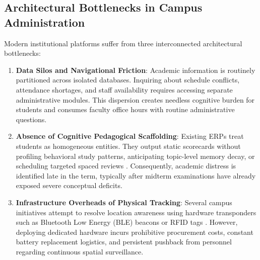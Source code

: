 \documentclass[conference]{IEEEtran}
\begin{document}
\subsection{Architectural Bottlenecks in Campus Administration}
Modern institutional platforms suffer from three interconnected architectural bottlenecks:
\begin{enumerate}
    \item \textbf{Data Silos and Navigational Friction}: Academic information is routinely partitioned across isolated databases. Inquiring about schedule conflicts, attendance shortages, and staff availability requires accessing separate administrative modules. This dispersion creates needless cognitive burden for students and consumes faculty office hours with routine administrative questions.
    \item \textbf{Absence of Cognitive Pedagogical Scaffolding}: Existing ERPs treat students as homogeneous entities. They output static scorecards without profiling behavioral study patterns, anticipating topic-level memory decay, or scheduling targeted spaced reviews \cite{wang2024telemetry, srivastava2024forgetting}. Consequently, academic distress is identified late in the term, typically after midterm examinations have already exposed severe conceptual deficits.
    \item \textbf{Infrastructure Overheads of Physical Tracking}: Several campus initiatives attempt to resolve location awareness using hardware transponders such as Bluetooth Low Energy (BLE) beacons or RFID tags \cite{sharma2023timetable}. However, deploying dedicated hardware incurs prohibitive procurement costs, constant battery replacement logistics, and persistent pushback from personnel regarding continuous spatial surveillance.
\end{enumerate}
\end{document}
